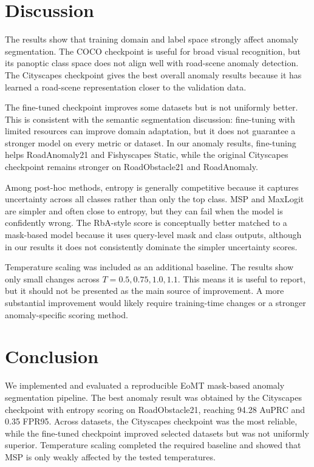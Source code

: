 \section{Discussion}
The results show that training domain and label space strongly affect anomaly segmentation. The COCO checkpoint is useful for broad visual recognition, but its panoptic class space does not align well with road-scene anomaly detection. The Cityscapes checkpoint gives the best overall anomaly results because it has learned a road-scene representation closer to the validation data.

The fine-tuned checkpoint improves some datasets but is not uniformly better. This is consistent with the semantic segmentation discussion: fine-tuning with limited resources can improve domain adaptation, but it does not guarantee a stronger model on every metric or dataset. In our anomaly results, fine-tuning helps RoadAnomaly21 and Fishyscapes Static, while the original Cityscapes checkpoint remains stronger on RoadObstacle21 and RoadAnomaly.

Among post-hoc methods, entropy is generally competitive because it captures uncertainty across all classes rather than only the top class. MSP and MaxLogit are simpler and often close to entropy, but they can fail when the model is confidently wrong. The RbA-style score is conceptually better matched to a mask-based model because it uses query-level mask and class outputs, although in our results it does not consistently dominate the simpler uncertainty scores.

Temperature scaling was included as an additional baseline. The results show only small changes across $T=0.5,0.75,1.0,1.1$. This means it is useful to report, but it should not be presented as the main source of improvement. A more substantial improvement would likely require training-time changes or a stronger anomaly-specific scoring method.

\section{Conclusion}
We implemented and evaluated a reproducible EoMT mask-based anomaly segmentation pipeline. The best anomaly result was obtained by the Cityscapes checkpoint with entropy scoring on RoadObstacle21, reaching 94.28 AuPRC and 0.35 FPR95. Across datasets, the Cityscapes checkpoint was the most reliable, while the fine-tuned checkpoint improved selected datasets but was not uniformly superior. Temperature scaling completed the required baseline and showed that MSP is only weakly affected by the tested temperatures.

{\small


}
